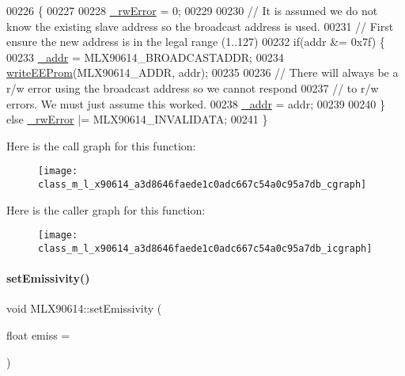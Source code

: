 \begin{DoxyCode}
00226                                    \{
00227 
00228     \mbox{\hyperlink{class_m_l_x90614_a8c203cc9359c283d07682ba7dbcc5de3}{\_rwError}} = 0;
00229 
00230     \textcolor{comment}{// It is assumed we do not know the existing slave address so the broadcast address is used.}
00231     \textcolor{comment}{// First ensure the new address is in the legal range (1..127)}
00232     \textcolor{keywordflow}{if}(addr &= 0x7f) \{
00233         \mbox{\hyperlink{class_m_l_x90614_a768925264f76f33f9bf98aec1cbec6a9}{\_addr}} = MLX90614\_BROADCASTADDR;
00234         \mbox{\hyperlink{class_m_l_x90614_a70b3e428c623b6af5bedf199f5c16490}{writeEEProm}}(MLX90614\_ADDR, addr);
00235         
00236         \textcolor{comment}{// There will always be a r/w error using the broadcast address so we cannot respond}
00237         \textcolor{comment}{// to r/w errors. We must just assume this worked.}
00238         \mbox{\hyperlink{class_m_l_x90614_a768925264f76f33f9bf98aec1cbec6a9}{\_addr}} = addr;
00239         
00240     \} \textcolor{keywordflow}{else} \mbox{\hyperlink{class_m_l_x90614_a8c203cc9359c283d07682ba7dbcc5de3}{\_rwError}} |= MLX90614\_INVALIDATA;
00241 \}
\end{DoxyCode}
Here is the call graph for this function\+:\nopagebreak
\begin{figure}[H]
\begin{center}
\leavevmode
\texttt{[image: class\_m\_l\_x90614\_a3d8646faede1c0adc667c54a0c95a7db\_cgraph]}
\end{center}
\end{figure}
Here is the caller graph for this function\+:\nopagebreak
\begin{figure}[H]
\begin{center}
\leavevmode
\texttt{[image: class\_m\_l\_x90614\_a3d8646faede1c0adc667c54a0c95a7db\_icgraph]}
\end{center}
\end{figure}
\mbox{\label{class_m_l_x90614_ab7e462d10f8d26bdd55f77eb4c81a5ff}} 
\paragraph{\texorpdfstring{set\+Emissivity()}{setEmissivity()}}
{\footnotesize\ttfamily void M\+L\+X90614\+::set\+Emissivity (\begin{DoxyParamCaption}\item[{float}]{emiss = {} }\end{DoxyParamCaption})}



